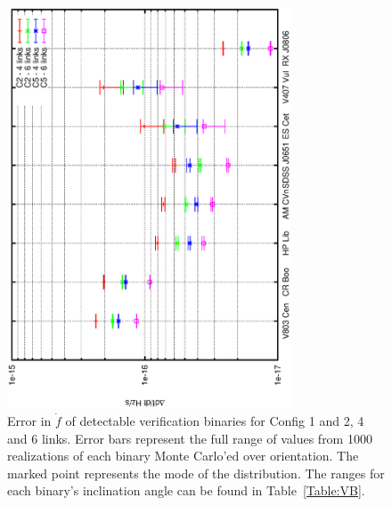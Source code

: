 \documentclass{iopart}
\begin{document}
\begin{figure}[H]
\begin{center}
   \includegraphics[angle=270,width=0.75\textwidth]{FigGBTyson/fdot.eps} %
   \caption{Error in $\dot{f}$ of detectable verification binaries for Config 1 and 2, 4 and 6 links.  Error bars represent the full range of values from 1000 realizations of each binary Monte Carlo'ed over orientation.  The marked point represents the mode of the distribution.  The ranges for each binary's inclination angle can be found in Table~\ref{Table:VB}.}
   \label{Figure:VBfdot}
   \end{center}
\end{figure}
\end{document}
